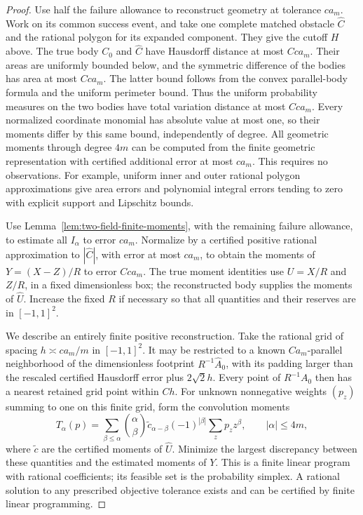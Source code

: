 \begin{proof}
Use half the failure allowance to reconstruct geometry at tolerance
$c a_m$.  Work on its common success event, and take one complete
matched obstacle $\widehat C$ and the rational polygon for its
expanded component.  They give the cutoff $H$ above.  The true body
$C_0$ and $\widehat C$ have Hausdorff distance at most $C c a_m$.
Their areas are uniformly bounded below, and the symmetric
difference of the bodies has area at most $C c a_m$.  The latter
bound follows from the convex parallel-body formula and the uniform
perimeter bound.  Thus the uniform probability measures on the two
bodies have total variation distance at most $C c a_m$.
Every normalized coordinate monomial has absolute value at most one,
so their moments differ by this same bound, independently of degree.
All geometric moments through degree $4m$ can be computed from the
finite geometric representation with certified additional error at
most $c a_m$.  This requires no observations.  For example, uniform
inner and outer rational polygon approximations give area errors and
polynomial integral errors tending to zero with explicit support and
Lipschitz bounds.

Use Lemma~\ref{lem:two-field-finite-moments}, with the remaining
failure allowance, to estimate all $I_\alpha$ to error $c a_m$.
Normalize by a certified positive rational approximation to
$|\widehat C|$, with error at most $c a_m$, to obtain the moments
of $Y=(X-Z)/R$ to error $C c a_m$.  The true moment identities use
$U=X/R$ and $Z/R$, in a fixed dimensionless box; the reconstructed
body supplies the moments of $\widehat U$.  Increase the fixed $R$
if necessary so that all quantities and their reserves are in
$[-1,1]^2$.

We describe an entirely finite positive reconstruction.  Take the
rational grid of spacing $h\asymp c a_m/m$ in $[-1,1]^2$.  It may
be restricted to a known $Ca_m$-parallel neighborhood of the
dimensionless footprint $R^{-1}\widehat A_0$, with its padding larger
than the rescaled certified Hausdorff error plus $2\sqrt2h$. Every
point of $R^{-1}A_0$ then has a nearest retained grid point within $Ch$.  For unknown
nonnegative weights $(p_z)$ summing to one on this finite grid,
form the convolution moments
\[
 T_\alpha(p)=\sum_{\beta\le\alpha}\binom{\alpha}{\beta}
       \widetilde c_{\alpha-\beta}(-1)^{|\beta|}
                         \sum_zp_z z^\beta,
                       \qquad |\alpha|\le4m,
\]
where $\widetilde c$ are the certified moments of $\widehat U$.
Minimize the largest discrepancy between these quantities and the
estimated moments of $Y$.  This is a finite linear program with
rational coefficients; its feasible set is the probability simplex.
A rational solution to any prescribed objective tolerance exists
and can be certified by finite linear programming.


\end{proof}
